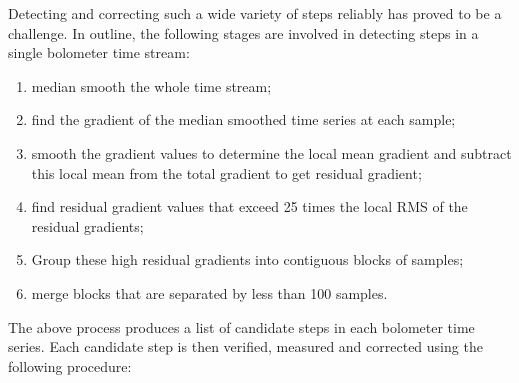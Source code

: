\documentclass[useAMS,usenatbib,nofootinbib]{mn2e}
\begin{document}
Detecting and correcting such a wide variety of steps reliably has proved
to be a challenge. In outline, the following stages
are involved in detecting steps in a single bolometer time stream:

\begin{enumerate}

\item median smooth the whole time stream;

\item find the gradient of the median smoothed time series at each
sample;

\item smooth the gradient values to determine the local mean gradient
and subtract this local mean from the total gradient to get residual
gradient;

\item find residual gradient values that exceed 25 times the local RMS
of the residual gradients;

\item Group these high residual gradients into contiguous blocks of
samples;

\item merge blocks that are separated by less than 100 samples.
\end{enumerate}

The above process produces a list of candidate steps in each bolometer
time series. Each candidate step is then verified, measured and corrected
using the following procedure:
\end{document}
